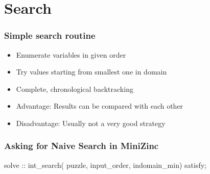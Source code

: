 \clearpage
\section{Search}

\begin{frame}
\frametitle{Simple search routine}
\begin{itemize}
\item Enumerate variables in given order
\item Try values starting from smallest one in domain
\item Complete, chronological backtracking
\item Advantage: Results can be compared with each other
\item Disadvantage: Usually not a very good strategy
\end{itemize}
\end{frame}

\begin{frame}[fragile]
  \frametitle{Asking for Naive Search in MiniZinc}
  \begin{semiverbatim}
    solve :: int\_search(
      puzzle,    
      input\_order,   
      indomain\_min)    
    satisfy;
  \end{semiverbatim}
\end{frame}

